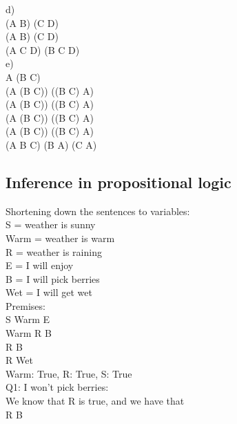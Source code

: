 \documentclass{article}
\begin{document}
d)\\
(A \wedge B) \vee (C \Rightarrow D)\\
(A \wedge B) \vee (\neg C \vee D)\\
(A \vee \neg C \vee D) \wedge (B \vee \neg C \vee D)\\

e)\\
A \Leftrightarrow (B \Rightarrow \neg C)\\
(A \Rightarrow (B \Rightarrow \neg C)) \wedge ((B \Rightarrow \neg C) \Rightarrow A)\\
(\neg A \vee (B \Rightarrow \neg C)) \wedge (\neg (B \Rightarrow \neg C) \vee A)\\
(\neg A \vee (\neg B \vee \neg C)) \wedge (\neg (\neg B \vee \neg C) \vee A)\\
(\neg A \vee (\neg B \vee \neg C)) \wedge ((B \wedge C) \vee A)\\
(\neg A \vee \neg B \vee \neg C) \wedge (B \vee A) \wedge (C \vee A)\\

\subsection{Inference in propositional logic}

Shortening down the sentences to variables:\\

\noindent S = weather is sunny\\
Warm = weather is warm\\
R = weather is raining\\
E = I will enjoy\\
B = I will pick berries\\
Wet = I will get wet\\

\noindent Premises:\\

S \wedge Warm \Rightarrow E\\
Warm \wedge  R \Rightarrow B\\
R \Rightarrow \neg B\\
R \Rightarrow Wet\\

\noindent Warm: True, R: True, S: True\\


\noindent Q1: I won’t pick berries:\\
We know that R is true, and we have that\\
R \Rightarrow \neg B\\
\end{document}
